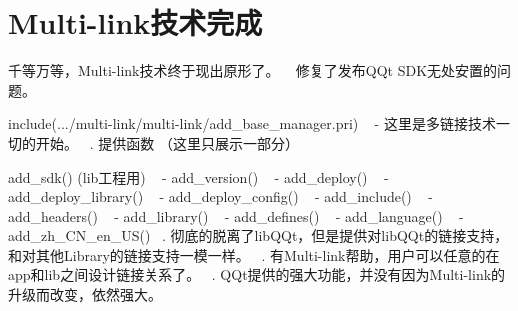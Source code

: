 \section*{Multi-\/link技术完成}

千等万等，\+Multi-\/link技术终于现出原形了。 ~\newline
修复了发布\+Q\+Qt S\+D\+K无处安置的问题。 ~\newline

\begin{DoxyEnumerate}
\item include(.../multi-\/link/multi-\/link/add\+\_\+base\+\_\+manager.pri) ~\newline
 -\/ 这里是多链接技术一切的开始。 ~. 提供函数 （这里只展示一部分）
\begin{DoxyItemize}
\item add\+\_\+sdk() (lib工程用) ~\newline
 -\/ add\+\_\+version() ~\newline
 -\/ ﻿add\+\_\+deploy() ~\newline
 -\/ ﻿add\+\_\+deploy\+\_\+library() ~\newline
 -\/ ﻿add\+\_\+deploy\+\_\+config() ~\newline
 -\/ ﻿add\+\_\+include() ~\newline
 -\/ ﻿add\+\_\+headers() ~\newline
 -\/ ﻿add\+\_\+library() ~\newline
 -\/ ﻿add\+\_\+defines() ~\newline
 -\/ ﻿add\+\_\+language() ~\newline
 -\/ ﻿add\+\_\+zh\+\_\+\+C\+N\+\_\+en\+\_\+\+U\+S() ~. 彻底的脱离了lib\+Q\+Qt，但是提供对lib\+Q\+Qt的链接支持，和对其他\+Library的链接支持一模一样。 ~. 有\+Multi-\/link帮助，用户可以任意的在app和lib之间设计链接关系了。 ~. Q\+Qt提供的强大功能，并没有因为\+Multi-\/link的升级而改变，依然强大。 
\end{DoxyItemize}
\end{DoxyEnumerate}